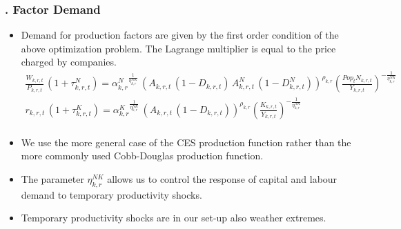 \documentclass[11pt,aspectratio=169]{beamer}
\begin{document}
\begin{frame}
\frametitle{{\thesection.\thesubsection} Factor Demand}
\scriptsize
\begin{itemize}
\item Demand for production factors are given by the first order condition of the above optimization problem. The Lagrange multiplier is equal to the price charged by companies. 
\begin{align*}
\frac{W_{k,r,t}}{P_{k,r,t}}  \, (1 + \tau^{N}_{k,r,t}) = {\alpha^{N}_{k,r}}^{\frac{1}{\eta^{NK}_{k,r}}} \, \left(A_{k,r,t} \, (1 - D_{k,r,t}) \, A^N_{k,r,t} \, (1 - D^N_{k,r,t})\right)^{\rho_{k,r}} \left(\frac{Pop_{t} N_{k,r,t}}{Y_{k,r,t}}\right)^{-\frac{1}{\eta^{NK}_{k,r}}} \nonumber \\ 
r_{k,r,t} \, (1 + \tau^{K}_{k,r,t}) = {\alpha^{K}_{k,r}}^{\frac{1}{\eta^{NK}_{k,r}}} \, \left(A_{k,r,t} \, (1 - D_{k,r,t})\right)^{\rho_{k,r}}\left(\frac{K_{k,r,t}}{Y_{k,r,t}} \right)^{-\frac{1}{\eta^{NK}_{k,r}}} \\ 
\end{align*}
\item We use the more general case of the CES production function rather than the more commonly used Cobb-Douglas production function. 
\item The parameter $\eta^{NK}_{k,r}$ allows us to control the response of capital and labour demand to temporary productivity shocks. 
\item Temporary productivity shocks are in our set-up also weather extremes. 
\end{itemize}
\end{frame}
\end{document}
